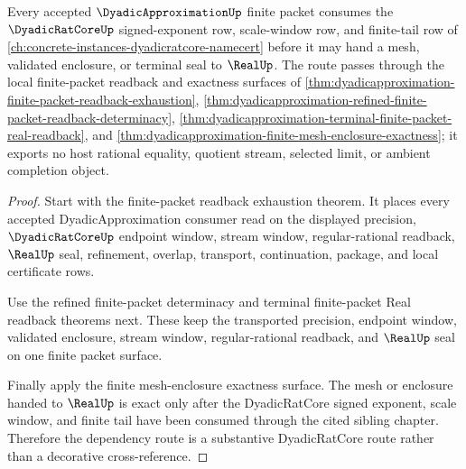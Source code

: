 \begin{theorem}
\label{thm:dyadic-approximation-dyadicratcore-dependency-route}
Every accepted $\DyadicApproximationUp$ finite packet consumes the $\DyadicRatCoreUp$ signed-exponent row, scale-window row, and finite-tail row of \autoref{ch:concrete-instances-dyadicratcore-namecert} before it may hand a mesh, validated enclosure, or terminal seal to $\RealUp$. The route passes through the local finite-packet readback and exactness surfaces of \autoref{thm:dyadicapproximation-finite-packet-readback-exhaustion}, \autoref{thm:dyadicapproximation-refined-finite-packet-readback-determinacy}, \autoref{thm:dyadicapproximation-terminal-finite-packet-real-readback}, and \autoref{thm:dyadicapproximation-finite-mesh-enclosure-exactness}; it exports no host rational equality, quotient stream, selected limit, or ambient completion object.
\end{theorem}
\begin{proof}
Start with the finite-packet readback exhaustion theorem. It places every accepted DyadicApproximation consumer read on the displayed precision, $\DyadicRatCoreUp$ endpoint window, stream window, regular-rational readback, $\RealUp$ seal, refinement, overlap, transport, continuation, package, and local certificate rows.

Use the refined finite-packet determinacy and terminal finite-packet Real readback theorems next. These keep the transported precision, endpoint window, validated enclosure, stream window, regular-rational readback, and $\RealUp$ seal on one finite packet surface.

Finally apply the finite mesh-enclosure exactness surface. The mesh or enclosure handed to $\RealUp$ is exact only after the DyadicRatCore signed exponent, scale window, and finite tail have been consumed through the cited sibling chapter. Therefore the dependency route is a substantive DyadicRatCore route rather than a decorative cross-reference.
\end{proof}
